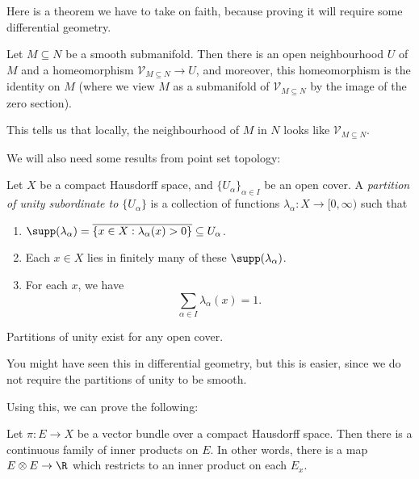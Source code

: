 \documentclass[a4paper]{article}
\theoremstyle{definition}
\begin{document}
Here is a theorem we have to take on faith, because proving it will require some differential geometry.
\begin{thm}
  Let $M \subseteq N$ be a smooth submanifold. Then there is an open neighbourhood $U$ of $M$ and a homeomorphism $\mathcal{V}_{M \subseteq N} \to U$, and moreover, this homeomorphism is the identity on $M$ (where we view $M$ as a submanifold of $\mathcal{V}_{M \subseteq N}$ by the image of the zero section).
\end{thm}
This tells us that locally, the neighbourhood of $M$ in $N$ looks like $\mathcal{V}_{M \subseteq N}$.

We will also need some results from point set topology:
\begin{defi}
  Let $X$ be a compact Hausdorff space, and $\{U_\alpha\}_{\alpha \in I}$ be an open cover. A \emph{partition of unity subordinate to $\{U_\alpha\}$} is a collection of functions $\lambda_\alpha: X \to [0, \infty)$ such that
  \begin{enumerate}
    \item $\supp(\lambda_\alpha) = \overline{\{x \in X: \lambda_\alpha(x) > 0\}} \subseteq U_\alpha$.
    \item Each $x \in X$ lies in finitely many of these $\supp (\lambda_\alpha)$.
    \item For each $x$, we have
      \[
        \sum_{\alpha \in I}\lambda_\alpha(x) = 1.
      \]
  \end{enumerate}
\end{defi}

\begin{prop}
  Partitions of unity exist for any open cover.
\end{prop}

You might have seen this in differential geometry, but this is easier, since we do not require the partitions of unity to be smooth.

Using this, we can prove the following:
\begin{lemma}
  Let $\pi: E \to X$ be a vector bundle over a compact Hausdorff space. Then there is a continuous family of inner products on $E$. In other words, there is a map $E \otimes E \to \R$ which restricts to an inner product on each $E_x$.
\end{lemma}
\end{document}

